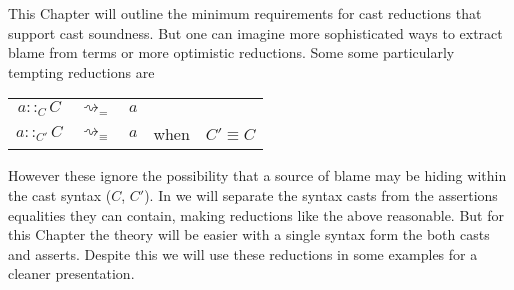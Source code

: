 This Chapter will outline the minimum requirements for cast reductions that support cast soundness.
But one can imagine more sophisticated ways to extract blame from terms or more optimistic reductions.
Some some particularly tempting reductions are

\begin{tabular}{ccccc}
$a::_{C}C$ & $\rightsquigarrow_{=}$ & $a$ &  & \tabularnewline
$a::_{C'}C$ & $\rightsquigarrow_{\equiv}$ & $a$ & when & $C'\equiv C$\tabularnewline
\end{tabular}

However these ignore the possibility that a source of blame may be hiding within the cast syntax ($C$, $C'$).
In  we will separate the syntax casts from the assertions equalities they can contain, making reductions like the above reasonable.
But for this Chapter the theory will be easier with a single syntax form the both casts and asserts.
Despite this we will use these reductions in some examples for a cleaner presentation.






